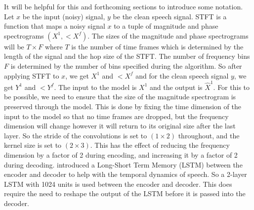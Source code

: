 \documentclass[logo,bsc,singlespacing,parskip,online]{infthesis}
\begin{document}
It will be helpful for this and forthcoming sections to introduce some notation.
Let $x$ be the input (noisy) signal, $y$ be the clean speech signal. 
STFT is a function that maps a noisy signal $x$ to a tuple of magnitude and phase spectrograms $(X^{1}, <X^{f})$.
The sizes of the magnitude and phase spectrograms will be $T \times F$ where $T$ is the number of time frames which is 
determined by the length of the signal and the hop size of the STFT. The number of frequency bins $F$ is determined by the 
number of bins specified during the algorithm.
So after applying STFT to $x$, we get $X^{1}$ and $<X^{f}$ and for the clean speech signal $y$, we get $Y^{1}$ and $<Y^{f}$.
The input to the model is $X^{1}$ and the output is $\hat{X}^{1}$. For this to be possible, we need to ensure that the size of the 
magnitude spectrogram is preserved through the model. This is done by fixing the time dimension of the input to the model 
so that no time frames are dropped, but the frequency dimension will change however it will return to its original size after the last layer.
So the stride of the convolutions is set to $(1 \times 2)$ throughout, and the kernel size is set to $(2 \times 3)$. 
This has the effect of reducing the frequency dimension by a factor of 2 during encoding, and increasing it by a factor of 2 during decoding.
\citet{tan18_interspeech} introduced a Long-Short Term Memory (LSTM) between the encoder and decoder to help with 
the temporal dynamics of speech. So a 2-layer LSTM with 1024 units is used between the encoder and decoder. This 
does require the need to reshape the output of the LSTM before it is passed into the decoder.
\end{document}
